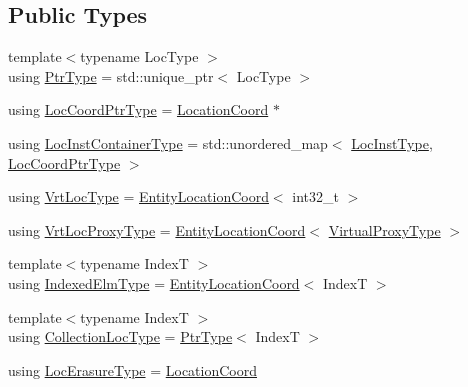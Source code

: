 \subsection*{Public Types}
\begin{DoxyCompactItemize}
\item 
{\footnotesize template$<$typename Loc\+Type $>$ }\\using \hyperlink{structvt_1_1location_1_1_location_manager_a32d8bca6ed6909a2190286408335d3b4}{Ptr\+Type} = std\+::unique\+\_\+ptr$<$ Loc\+Type $>$
\item 
using \hyperlink{structvt_1_1location_1_1_location_manager_a98ed824c058080e538546fc731cb8f4c}{Loc\+Coord\+Ptr\+Type} = \hyperlink{structvt_1_1location_1_1_location_coord}{Location\+Coord} $\ast$
\item 
using \hyperlink{structvt_1_1location_1_1_location_manager_adf4df6480ad89271a802d6d59bcf424e}{Loc\+Inst\+Container\+Type} = std\+::unordered\+\_\+map$<$ \hyperlink{namespacevt_1_1location_a4db6456e8024af2d23fc5ae560fef866}{Loc\+Inst\+Type}, \hyperlink{structvt_1_1location_1_1_location_manager_a98ed824c058080e538546fc731cb8f4c}{Loc\+Coord\+Ptr\+Type} $>$
\item 
using \hyperlink{structvt_1_1location_1_1_location_manager_a06ec1698d93780afdf7873eeaa3a77b6}{Vrt\+Loc\+Type} = \hyperlink{structvt_1_1location_1_1_entity_location_coord}{Entity\+Location\+Coord}$<$ int32\+\_\+t $>$
\item 
using \hyperlink{structvt_1_1location_1_1_location_manager_a3e410c85f5790a526a4eda22a9cc7881}{Vrt\+Loc\+Proxy\+Type} = \hyperlink{structvt_1_1location_1_1_entity_location_coord}{Entity\+Location\+Coord}$<$ \hyperlink{namespacevt_a1b417dd5d684f045bb58a0ede70045ac}{Virtual\+Proxy\+Type} $>$
\item 
{\footnotesize template$<$typename IndexT $>$ }\\using \hyperlink{structvt_1_1location_1_1_location_manager_a9241475655a978ac717ffe5791ad7d15}{Indexed\+Elm\+Type} = \hyperlink{structvt_1_1location_1_1_entity_location_coord}{Entity\+Location\+Coord}$<$ IndexT $>$
\item 
{\footnotesize template$<$typename IndexT $>$ }\\using \hyperlink{structvt_1_1location_1_1_location_manager_a64dfcff13e5cebcdfb31998bef4b8d58}{Collection\+Loc\+Type} = \hyperlink{structvt_1_1location_1_1_location_manager_a32d8bca6ed6909a2190286408335d3b4}{Ptr\+Type}$<$ IndexT $>$
\item 
using \hyperlink{structvt_1_1location_1_1_location_manager_a0c153c55a8938e99fad5386699653220}{Loc\+Erasure\+Type} = \hyperlink{structvt_1_1location_1_1_location_coord}{Location\+Coord}

\end{DoxyCompactItemize}
